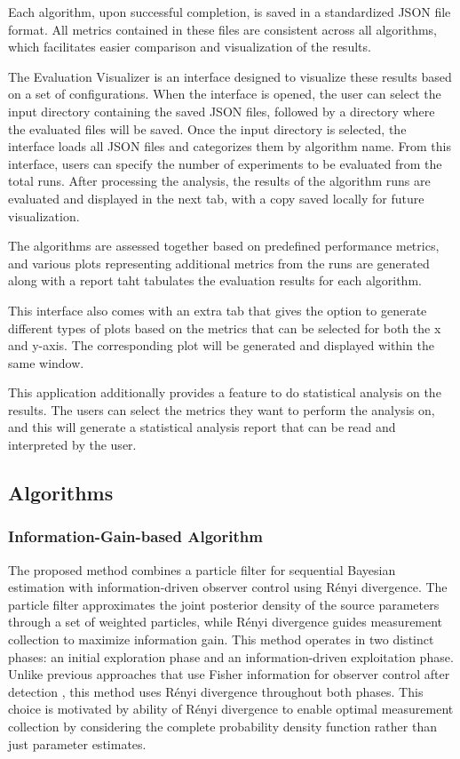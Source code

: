 \documentclass[../report.tex]{subfiles}
\begin{document}
    Each algorithm, upon successful completion, is saved in a standardized JSON file format. All metrics contained in these files are consistent across all algorithms, which facilitates easier 
    comparison and visualization of the results.

    The Evaluation Visualizer is an interface designed to visualize these results based on a set of configurations. When the interface is opened, the user can select the input directory containing 
    the saved JSON files, followed by a directory where the evaluated files will be saved. Once the input directory is selected, the interface loads all JSON files and categorizes them by algorithm
    name. From this interface, users can specify the number of experiments to be evaluated from the total runs. After processing the analysis, the results of the algorithm runs are evaluated and 
    displayed in the next tab, with a copy saved locally for future visualization.

    The algorithms are assessed together based on predefined performance metrics, and various plots representing additional metrics from the runs are generated along with a report taht tabulates 
    the evaluation results for each algorithm. 

    This interface also comes with an extra tab that gives the option to generate different types of plots based on the metrics that can be selected for both the x and y-axis. The corresponding 
    plot will be generated and displayed within the same window.

    This application additionally provides a feature to do statistical analysis on the results. The users can select the metrics they want to perform the analysis on, and this will generate a 
    statistical analysis report that can be read and interpreted by the user.

    \subsection{Algorithms}
    \subsubsection{Information-Gain-based Algorithm}

    The proposed method combines a particle filter for sequential Bayesian estimation with information-driven observer control using Rényi divergence. The particle filter approximates
    the joint posterior density of the source parameters through a set of weighted particles, while Rényi divergence guides measurement collection to maximize information gain. 
    This method operates in two distinct phases: an initial exploration phase and an information-driven exploitation phase. Unlike previous approaches that use Fisher information for observer control
    after detection \cite{Ristic2007AnIG}, this method uses Rényi divergence throughout both phases. This choice is motivated by ability of Rényi divergence to enable optimal measurement collection 
    by considering the complete probability density function rather than just parameter estimates.
\end{document}

